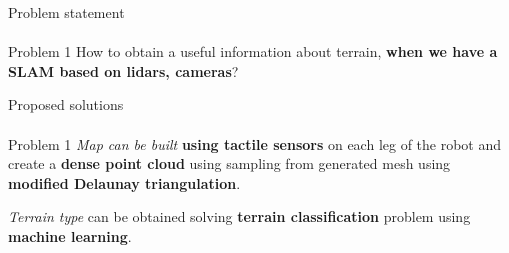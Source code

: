\documentclass[aspectratio=169]{beamer}
\begin{document}



\begin{frame}[t]{Problem statement}
    \framesubtitle{}
    \begin{block}{Problem 1}
        \Large
        How to obtain a useful information about terrain, \textbf{when we have a SLAM based on lidars, cameras}?
        \vspace{5pt}

    \end{block}
\end{frame}

\begin{frame}[t]{Proposed solutions}
    \framesubtitle{}
    \begin{exampleblock}{Problem 1}
        \Large
        \textit{Map can be built} \textbf{using tactile sensors} on each leg of the robot and create a \textbf{dense point cloud} using sampling from generated mesh using \textbf{modified Delaunay triangulation}.
        \vspace{5pt}

        \textit{Terrain type} can be obtained solving \textbf{terrain classification} problem using \textbf{machine learning}.
    \end{exampleblock}
\end{frame}
\end{document}
